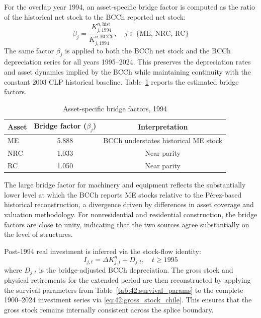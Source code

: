For the overlap year 1994, an asset-specific bridge factor is
computed as the ratio of the historical net stock to the BCCh
reported net stock:
\begin{equation}
	\beta_j = \frac{K^{n,\text{hist}}_{j,1994}}
	{K^{n,\text{BCCh}}_{j,1994}},
	\quad j \in \{\text{ME},\, \text{NRC},\, \text{RC}\}
	\label{eq:42:bridge_factor}
\end{equation}
The same factor $\beta_j$ is applied to both the BCCh net stock and
the BCCh depreciation series for all years 1995--2024. This
preserves the depreciation rates and asset dynamics implied by the
BCCh while maintaining continuity with the constant 2003 CLP
historical baseline. Table~\ref{tab:42:bridge_factors} reports the
estimated bridge factors.

\begin{table}[h]
	\centering
	\caption{Asset-specific bridge factors, 1994}
	\label{tab:42:bridge_factors}
	\begin{tabular}{lcc}
		\toprule
		Asset & Bridge factor ($\beta_j$) & Interpretation \\
		\midrule
		ME  & 5.888 & BCCh understates historical ME stock \\
		NRC & 1.033 & Near parity \\
		RC  & 1.050 & Near parity \\
		\bottomrule
	\end{tabular}
\end{table}

The large bridge factor for machinery and equipment reflects the
substantially lower level at which the BCCh reports ME stocks
relative to the Pérez-based historical reconstruction, a divergence
driven by differences in asset coverage and valuation methodology.
For nonresidential and residential construction, the bridge factors
are close to unity, indicating that the two sources agree
substantially on the level of structures.

Post-1994 real investment is inferred via the stock-flow identity:
\begin{equation}
	I_{j,t} = \Delta K^{n}_{j,t} + D_{j,t},
	\quad t \geq 1995
	\label{eq:42:post94_investment}
\end{equation}
where $D_{j,t}$ is the bridge-adjusted BCCh depreciation. The gross
stock and physical retirements for the extended period are then
reconstructed by applying the survival parameters from
Table~\ref{tab:42:survival_params} to the complete 1900--2024
investment series via
\cref{eq:42:gross_stock_chile}. This ensures that the gross stock
remains internally consistent across the splice boundary.


